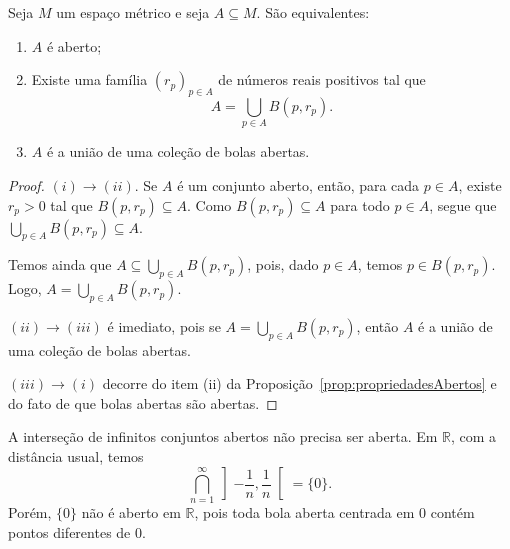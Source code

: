 \begin{corollary}\label{corolario:abertos-uniao-bolas}
    Seja $M$ um espaço métrico e seja $A\subseteq M$.
    São equivalentes:
    \begin{enumerate}[label=(\roman*)]
        \item $A$ é aberto;
        \item Existe uma família $(r_p)_{p\in A}$ de números reais positivos tal que
        \[
            A = \bigcup_{p\in A} B(p, r_p).
        \]
        \item $A$ é a união de uma coleção de bolas abertas.
    \end{enumerate}
\end{corollary}
\begin{proof}
    $(i)\rightarrow (ii)$.
    Se $A$ é um conjunto aberto, então, para cada $p \in A$, existe $r_p>0$ tal que $B(p, r_p)\subseteq A$.
    Como $B(p,r_p)\subseteq A$ para todo $p\in A$, segue que $\bigcup_{p\in A} B(p, r_p) \subseteq A$.

    Temos ainda que $A \subseteq \bigcup_{p\in A} B(p, r_p)$, pois, dado $p \in A$, temos $p \in B(p, r_p)$.
    Logo, $A = \bigcup_{p\in A} B(p, r_p)$.

    $(ii)\rightarrow (iii)$ é imediato, pois se $A = \bigcup_{p\in A} B(p, r_p)$, então $A$ é a união de uma coleção de bolas abertas.

    $(iii)\rightarrow (i)$ decorre do item (ii) da Proposição~\ref{prop:propriedadesAbertos} e do fato de que bolas abertas são abertas.
\end{proof}
\begin{example}
    A interseção de infinitos conjuntos abertos não precisa ser aberta.
    Em $\mathbb R$, com a distância usual, temos
    \[
        \bigcap_{n=1}^{\infty} \left]-\frac{1}{n},\frac{1}{n}\right[ = \{0\}.
    \]
    Porém, $\{0\}$ não é aberto em $\mathbb R$, pois toda bola aberta centrada em $0$ contém pontos diferentes de $0$.
\end{example}

